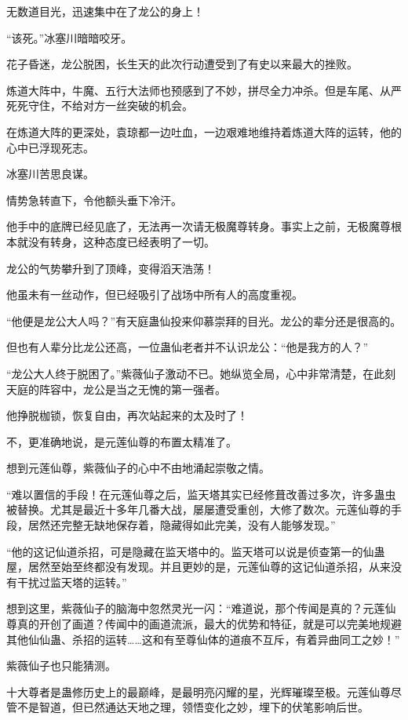 \begin{this_body}
无数道目光，迅速集中在了龙公的身上！

“该死。”冰塞川暗暗咬牙。

花子昏迷，龙公脱困，长生天的此次行动遭受到了有史以来最大的挫败。

炼道大阵中，牛魔、五行大法师也预感到了不妙，拼尽全力冲杀。但是车尾、从严死死守住，不给对方一丝突破的机会。

在炼道大阵的更深处，袁琼都一边吐血，一边艰难地维持着炼道大阵的运转，他的心中已浮现死志。

冰塞川苦思良谋。

情势急转直下，令他额头垂下冷汗。

他手中的底牌已经见底了，无法再一次请无极魔尊转身。事实上之前，无极魔尊根本就没有转身，这种态度已经表明了一切。

龙公的气势攀升到了顶峰，变得滔天浩荡！

他虽未有一丝动作，但已经吸引了战场中所有人的高度重视。

“他便是龙公大人吗？”有天庭蛊仙投来仰慕崇拜的目光。龙公的辈分还是很高的。

但也有人辈分比龙公还高，一位蛊仙老者并不认识龙公：“他是我方的人？”

“龙公大人终于脱困了。”紫薇仙子激动不已。她纵览全局，心中非常清楚，在此刻天庭的阵容中，龙公是当之无愧的第一强者。

他挣脱枷锁，恢复自由，再次站起来的太及时了！

不，更准确地说，是元莲仙尊的布置太精准了。

想到元莲仙尊，紫薇仙子的心中不由地涌起崇敬之情。

“难以置信的手段！在元莲仙尊之后，监天塔其实已经修葺改善过多次，许多蛊虫被替换。尤其是最近十多年几番大战，屡屡遭受重创，大修了数次。元莲仙尊的手段，居然还完整无缺地保存着，隐藏得如此完美，没有人能够发现。”

“他的这记仙道杀招，可是隐藏在监天塔中的。监天塔可以说是侦查第一的仙蛊屋，居然至始至终都没有发现。并且更妙的是，元莲仙尊的这记仙道杀招，从来没有干扰过监天塔的运转。”

想到这里，紫薇仙子的脑海中忽然灵光一闪：“难道说，那个传闻是真的？元莲仙尊真的开创了画道？传闻中的画道流派，最大的优势和特征，就是可以完美地规避其他仙仙蛊、杀招的运转……这和有至尊仙体的道痕不互斥，有着异曲同工之妙！”

紫薇仙子也只能猜测。

十大尊者是蛊修历史上的最巅峰，是最明亮闪耀的星，光辉璀璨至极。元莲仙尊尽管不是智道，但已然通达天地之理，领悟变化之妙，埋下的伏笔影响后世。


\end{this_body}
